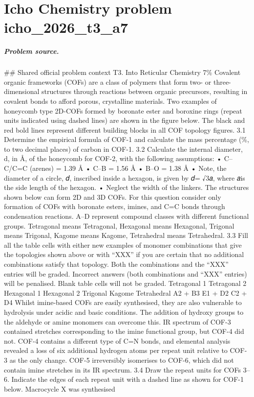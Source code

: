 
\chapter{Icho Chemistry problem icho\_2026\_t3\_a7}
\label{ch:IChO2026Problems_problem_icho_2026_t3_a7}

\paragraph{Problem source.}
\#\# Shared official problem context
T3. Into Reticular Chemistry 7\% Covalent organic frameworks (COFs) are a class of polymers that form two- or three-dimensional structures through reactions between organic precursors, resulting in covalent bonds to afford porous, crystalline materials. Two examples of honeycomb type 2D-COFs formed by boronate ester and boroxine rings (repeat units indicated using dashed lines) are shown in the figure below. The black and red bold lines represent different building blocks in all COF topology figures. 3.1 Determine the empirical formula of COF-1 and calculate the mass percentage (\%, to two decimal places) of carbon in COF-1. 3.2 Calculate the internal diameter, d, in Å, of the honeycomb for COF-2, with the following assumptions: • C–C/C=C (arenes) = 1.39 Å • C–B = 1.56 Å • B–O = 1.38 Å • Note, the diameter of a circle, 𝑑, inscribed inside a hexagon, is given by 𝑑= √3𝑎, where 𝑎is the side length of the hexagon. • Neglect the width of the linkers. The structures shown below can form 2D and 3D COFs. For this question consider only formation of COFs with boronate esters, imines, and C=C bonds through condensation reactions. A–D represent compound classes with different functional groups. Tetragonal means Tetragonal, Hexagonal means Hexagonal, Trigonal means Trigonal, Kagome means Kagome, Tetrahedral means Tetrahedral. 3.3 Fill all the table cells with either new examples of monomer combinations that give the topologies shown above or with “XXX” if you are certain that no additional combinations satisfy that topology. Both the combinations and the “XXX” entries will be graded. Incorrect answers (both combinations and “XXX” entries) will be penalised. Blank table cells will not be graded. Tetragonal 1 Tetragonal 2 Hexagonal 1 Hexagonal 2 Trigonal Kagome Tetrahedral A2 + B3 E1 + D2 C2 + D4 Whilst imine-based COFs are easily synthesised, they are also vulnerable to hydrolysis under acidic and basic conditions. The addition of hydroxy groups to the aldehyde or amine monomers can overcome this. IR spectrum of COF-3 contained stretches corresponding to the imine functional group, but COF-4 did not. COF-4 contains a different type of C=N bonds, and elemental analysis revealed a loss of six additional hydrogen atoms per repeat unit relative to COF-3 as the only change. COF-5 irreversibly isomerises to COF-6, which did not contain imine stretches in its IR spectrum. 3.4 Draw the repeat units for COFs 3–6. Indicate the edges of each repeat unit with a dashed line as shown for COF-1 below. Macrocycle X was synthesised 